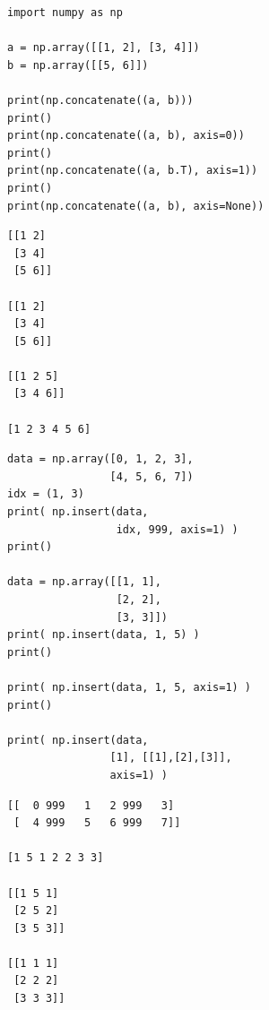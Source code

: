 \begin{frame}[fragile]
%
\begin{tcbraster}[raster columns=2,
                  raster equal height,
                  nobeforeafter,
                  raster column skip=0.2cm]
\begin{codebox}
\begin{verbatim}
import numpy as np

a = np.array([[1, 2], [3, 4]])
b = np.array([[5, 6]])

print(np.concatenate((a, b)))
print()
print(np.concatenate((a, b), axis=0))
print()
print(np.concatenate((a, b.T), axis=1))
print()
print(np.concatenate((a, b), axis=None))
\end{verbatim}
\end{codebox}
%
\begin{cmdbox}
\begin{verbatim}
[[1 2]
 [3 4]
 [5 6]]
 
[[1 2]
 [3 4]
 [5 6]]

[[1 2 5]
 [3 4 6]]

[1 2 3 4 5 6]
\end{verbatim}
\end{cmdbox}
\end{tcbraster}
%
\end{frame}


\begin{frame}[fragile]
%
\begin{tcbraster}[raster columns=2,
                  raster equal height,
                  nobeforeafter,
                  raster column skip=0.2cm]
\begin{codebox}
\begin{verbatim}
data = np.array([0, 1, 2, 3],
                [4, 5, 6, 7])
idx = (1, 3)
print( np.insert(data, 
                 idx, 999, axis=1) )
print()

data = np.array([[1, 1],
                 [2, 2],
                 [3, 3]])
print( np.insert(data, 1, 5) )
print()

print( np.insert(data, 1, 5, axis=1) )
print()

print( np.insert(data,
                [1], [[1],[2],[3]],
                axis=1) )
\end{verbatim}
\end{codebox}
%
\begin{cmdbox}
\begin{verbatim}
[[  0 999   1   2 999   3]
 [  4 999   5   6 999   7]]
 
[1 5 1 2 2 3 3]

[[1 5 1]
 [2 5 2]
 [3 5 3]]
 
[[1 1 1]
 [2 2 2]
 [3 3 3]]
\end{verbatim}
\end{cmdbox}
\end{tcbraster}
%
\end{frame}


